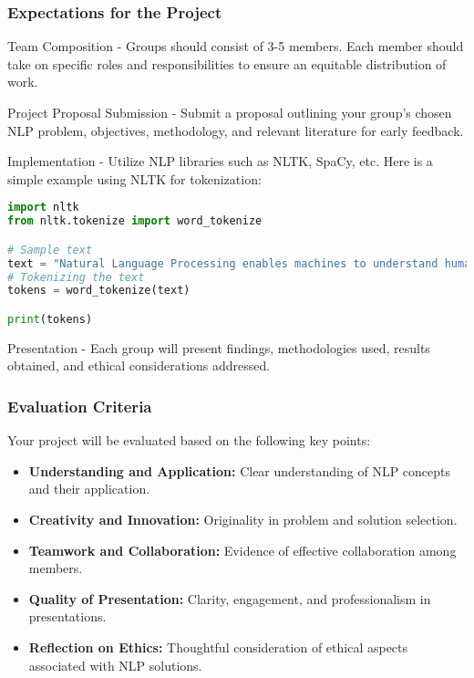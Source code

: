 \documentclass{beamer}
\begin{document}
\begin{frame}
    \frametitle{Expectations for the Project}
    \begin{block}{Team Composition}
        - Groups should consist of 3-5 members. Each member should take on specific roles and responsibilities to ensure an equitable distribution of work.
    \end{block}

    \begin{block}{Project Proposal Submission}
        - Submit a proposal outlining your group's chosen NLP problem, objectives, methodology, and relevant literature for early feedback.
    \end{block}

    \begin{block}{Implementation}
        - Utilize NLP libraries such as NLTK, SpaCy, etc. Here is a simple example using NLTK for tokenization:
        \begin{lstlisting}[language=Python]
import nltk
from nltk.tokenize import word_tokenize

# Sample text
text = "Natural Language Processing enables machines to understand human language."
# Tokenizing the text
tokens = word_tokenize(text)

print(tokens)
        \end{lstlisting}
    \end{block}

    \begin{block}{Presentation}
        - Each group will present findings, methodologies used, results obtained, and ethical considerations addressed.
    \end{block}
\end{frame}

\begin{frame}
    \frametitle{Evaluation Criteria}
    Your project will be evaluated based on the following key points:
    \begin{itemize}
        \item \textbf{Understanding and Application:} Clear understanding of NLP concepts and their application.
        \item \textbf{Creativity and Innovation:} Originality in problem and solution selection.
        \item \textbf{Teamwork and Collaboration:} Evidence of effective collaboration among members.
        \item \textbf{Quality of Presentation:} Clarity, engagement, and professionalism in presentations.
        \item \textbf{Reflection on Ethics:} Thoughtful consideration of ethical aspects associated with NLP solutions.
    \end{itemize}
\end{frame}
\end{document}
